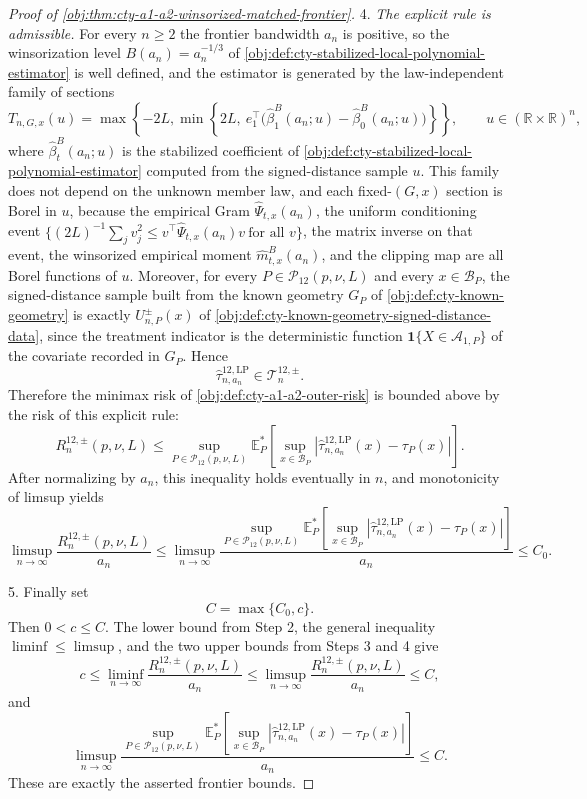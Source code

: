 \begin{proof}[Proof of \cref{obj:thm:cty-a1-a2-winsorized-matched-frontier}]
4. \emph{The explicit rule is admissible.}  For every \(n\ge 2\) the frontier bandwidth \(a_n\) is positive, so the winsorization level \(B(a_n)=a_n^{-1/3}\) of \cref{obj:def:cty-stabilized-local-polynomial-estimator} is well defined, and the estimator is generated by the law-independent family of sections
\[
T_{n,G,x}(u)
=
\max\!\left\{-2L,\min\!\left\{2L,\
e_1^\top\bigl(\widehat\beta^{B}_{1}(a_n;u)-\widehat\beta^{B}_{0}(a_n;u)\bigr)
\right\}\right\},
\qquad u\in(\mathbb R\times\mathbb R)^n,
\]
where \(\widehat\beta^{B}_{t}(a_n;u)\) is the stabilized coefficient of \cref{obj:def:cty-stabilized-local-polynomial-estimator} computed from the signed-distance sample \(u\).  This family does not depend on the unknown member law, and each fixed-\((G,x)\) section is Borel in \(u\), because the empirical Gram \(\widehat\Psi_{t,x}(a_n)\), the uniform conditioning event \(\{(2L)^{-1}\sum_{j}v_j^2\le v^\top\widehat\Psi_{t,x}(a_n)v\ \text{for all }v\}\), the matrix inverse on that event, the winsorized empirical moment \(\widehat m^{B}_{t,x}(a_n)\), and the clipping map are all Borel functions of \(u\).  Moreover, for every \(P\in\mathcal P_{12}(p,\nu,L)\) and every \(x\in\mathcal B_P\), the signed-distance sample built from the known geometry \(G_P\) of \cref{obj:def:cty-known-geometry} is exactly \(U^{\pm}_{n,P}(x)\) of \cref{obj:def:cty-known-geometry-signed-distance-data}, since the treatment indicator is the deterministic function \(\mathbf 1\{X\in\mathcal A_{1,P}\}\) of the covariate recorded in \(G_P\).  Hence
\[
\widehat\tau^{12,\mathrm{LP}}_{n,a_n}\in\mathcal T^{12,\pm}_n .
\]
Therefore the minimax risk of \cref{obj:def:cty-a1-a2-outer-risk} is bounded above by the risk of this explicit rule:
\[
R^{12,\pm}_n(p,\nu,L)
\le
\sup_{P\in\mathcal P_{12}(p,\nu,L)}
\mathbb E_P^*\!\left[
\sup_{x\in\mathcal B_P}
\left|\widehat\tau^{12,\mathrm{LP}}_{n,a_n}(x)-\tau_P(x)\right|
\right].
\]
After normalizing by \(a_n\), this inequality holds eventually in \(n\), and monotonicity of limsup yields
\[
\limsup_{n\to\infty}
\frac{R^{12,\pm}_n(p,\nu,L)}{a_n}
\le
\limsup_{n\to\infty}
\frac{
\sup_{P\in\mathcal P_{12}(p,\nu,L)}
\mathbb E_P^*\!\left[
\sup_{x\in\mathcal B_P}
\left|\widehat\tau^{12,\mathrm{LP}}_{n,a_n}(x)-\tau_P(x)\right|
\right]}
{a_n}
\le C_0 .
\]

5. Finally set
\[
C=\max\{C_0,c\}.
\]
Then \(0<c\le C\).  The lower bound from Step 2, the general inequality
\(\liminf\le\limsup\), and the two upper bounds from Steps 3 and 4 give
\[
c
\le
\liminf_{n\to\infty}\frac{R^{12,\pm}_n(p,\nu,L)}{a_n}
\le
\limsup_{n\to\infty}\frac{R^{12,\pm}_n(p,\nu,L)}{a_n}
\le
C,
\]
and
\[
\limsup_{n\to\infty}
\frac{
\sup_{P\in\mathcal P_{12}(p,\nu,L)}
\mathbb E_P^*\!\left[
\sup_{x\in\mathcal B_P}
\left|\widehat\tau^{12,\mathrm{LP}}_{n,a_n}(x)-\tau_P(x)\right|
\right]}
{a_n}
\le
C.
\]
These are exactly the asserted frontier bounds.
\end{proof}
